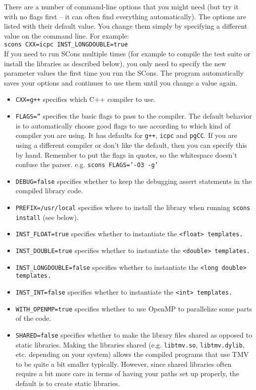 \begin{enumerate}
There are a number of command-line options that you might need (but try it with no flags
first -- it can often find everything automatically).  
The options are listed 
with their default value.  You change them simply by specifying a different value
on the command line.  For example:\\
\texttt{scons CXX=icpc INST\_LONGDOUBLE=true}\\
If you need to run SCons multiple times (for example to compile the test suite or install
the libraries as described below), you only need to specify the new parameter values the first
time you run the SCons.
The program automatically saves your options and continues to use them until you
change a value again.
\begin{itemize}
\item \texttt{CXX=g++} specifies which C++ compiler to use.
\item \texttt{FLAGS=''} specifies the basic flags to pass to the compiler.  The default behavior is to
automatically choose good flags to use according to which kind of compiler you are using.
It has defaults for \texttt{g++}, \texttt{icpc} and \texttt{pgCC}.  If you are using a different compiler or don't
like the default, then you can specify this by hand.  
Remember to put the flags in quotes,
so the whitespace doesn't confuse the parser.  e.g. \texttt{scons FLAGS='-O3 -g'}
\item \texttt{DEBUG=false} specifies whether to keep the debugging assert statements in the compiled library code.  
\item \texttt{PREFIX=/usr/local} specifies where to install the library when running \texttt{scons install} (see below).
\item \texttt{INST\_FLOAT=true} specifies whether to instantiate the \tt{<float>} templates.
\item \texttt{INST\_DOUBLE=true} specifies whether to instantiate the \tt{<double>} templates.
\item \texttt{INST\_LONGDOUBLE=false} specifies whether to instantiate the \tt{<long double>} templates.
\item \texttt{INST\_INT=false} specifies whether to instantiate the \tt{<int>} templates.
\item \texttt{WITH\_OPENMP=true} specifies whether to use OpenMP to parallelize some parts of the code.
\item \texttt{SHARED=false} specifies whether to make the library files shared as opposed to static libraries.  Making the libraries shared (e.g. \texttt{libtmv.so}, \texttt{libtmv.dylib}, etc. depending on your system) allows the compiled programs that use TMV to be quite a bit smaller typically.  However, since shared libraries often require a bit more care in terms of having your paths set up properly, the default is to create static libraries.

\end{itemize}
\end{enumerate}
